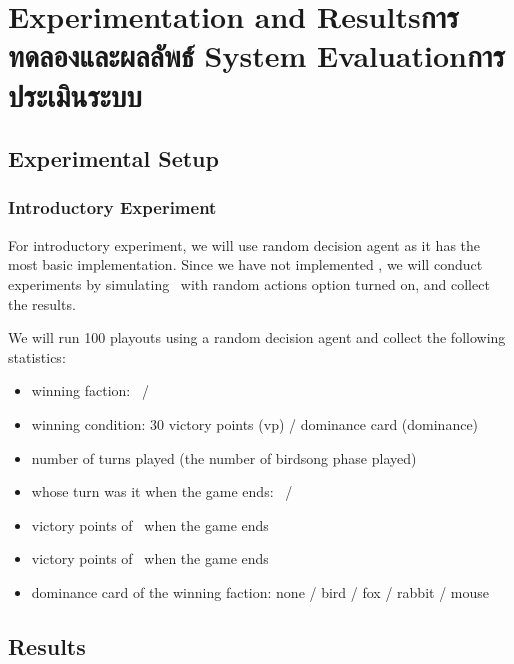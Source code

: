 \chapter{\ifproject%
\ifenglish Experimentation and Results\else การทดลองและผลลัพธ์\fi
\else%
\ifenglish System Evaluation\else การประเมินระบบ\fi
\fi}


\section{Experimental Setup}

\subsection{Introductory Experiment}
For introductory experiment, we will use random decision agent as it has the most basic implementation. Since we have not implemented \RootAI, we will conduct experiments by simulating \RootOurs \ with random actions option turned on, and collect the results. 

We will run 100 \glspl{playout} using a random decision agent and collect the following statistics:
\begin{itemize}
    \item winning faction: \Marquise \ / \Eyrie
    \item winning condition: 30 victory points (vp) / dominance card (dominance)
    \item number of turns played (the number of birdsong phase played)
    \item whose turn was it when the game ends: \Marquise \ / \Eyrie
    \item victory points of \Marquise \ when the game ends
    \item victory points of \Eyrie \ when the game ends
    \item dominance card of the winning faction: none / bird / fox / rabbit / mouse
\end{itemize}


\section{Results}